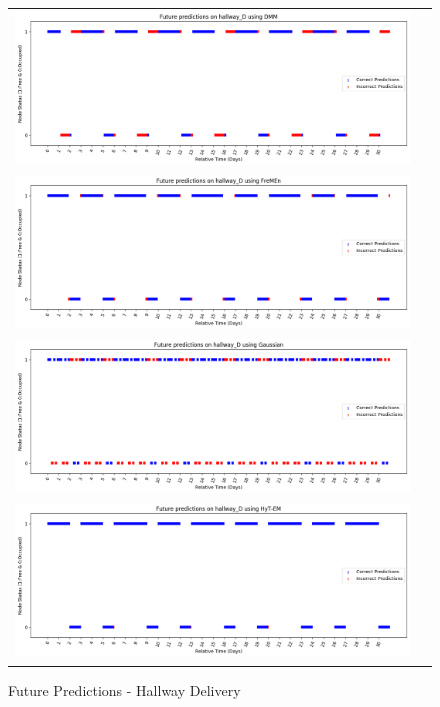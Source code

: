 \begin{center}
\begin{figure}[!Hp]
  \begin{tabular}{cc}
    {\includegraphics[width = 6in]{images/results/Future_hallway_D_DMM.png}} \\
    {\includegraphics[width = 6in]{images/results/Future_hallway_D_FreMEn.png}} \\
    {\includegraphics[width = 6in]{images/results/Future_hallway_D_Gaussian.png}} \\
    {\includegraphics[width = 6in]{images/results/Future_hallway_D_HyT-EM.png}} \\
  \end{tabular}
  \caption{Future Predictions - Hallway Delivery}
\end{figure}\\ \\


\end{center}
